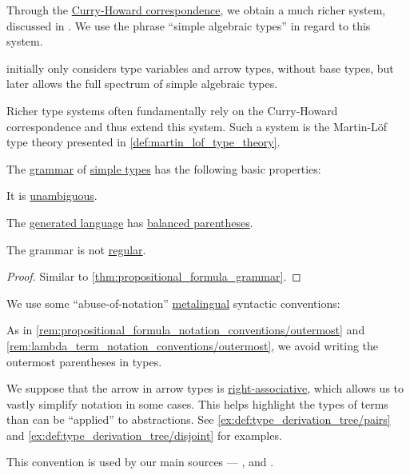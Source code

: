 \begin{concept}
\begin{thmenum}
     Through the \hyperref[con:curry_howard_correspondence]{Curry-Howard correspondence}, we obtain a much richer system, discussed in . We use the phrase \enquote{simple algebraic types} in regard to this system.

    \textcite[ch. 4]{Mimram2020ProgramEqualsProof} initially only considers type variables and arrow types, without base types, but later allows the full spectrum of simple algebraic types.

    Richer type systems often fundamentally rely on the Curry-Howard correspondence and thus extend this system. Such a system is the Martin-L\"of type theory presented in \cref{def:martin_lof_type_theory}.
  \end{thmenum}
\end{concept}

\begin{proposition}\label{thm:simple_type_grammar}
  The \hyperref[def:formal_grammar]{grammar} of \hyperref[def:simple_type]{simple types} has the following basic properties:
  \begin{thmenum}
     It is \hyperref[def:grammar_ambiguity]{unambiguous}.

     The \hyperref[def:formal_grammar/language]{generated language} has \hyperref[def:paired_delimiters]{balanced parentheses}.

     The grammar is not \hyperref[def:chomsky_hierarchy/regular]{regular}.
  \end{thmenum}
\end{proposition}
\begin{proof}
  Similar to \cref{thm:propositional_formula_grammar}.
\end{proof}

\begin{remark}\label{rem:simple_type_parentheses}
  We use some \enquote{abuse-of-notation} \hyperref[con:metalanguage]{metalingual} syntactic conventions:
  \begin{thmenum}
     As in \cref{rem:propositional_formula_notation_conventions/outermost} and \cref{rem:lambda_term_notation_conventions/outermost}, we avoid writing the outermost parentheses in types.

     We suppose that the arrow in arrow types is \hyperref[con:one_sided_associativity/right]{right-associative}, which allows us to vastly simplify notation in some cases. This helps highlight the types of terms than can be \enquote{applied} to abstractions. See \cref{ex:def:type_derivation_tree/pairs} and \cref{ex:def:type_derivation_tree/disjoint} for examples.

    This convention is used by our main sources --- \cite[\S 2A1.1]{Hindley1997BasicSTT}, \cite[notation 3.1.2]{Barendregt1992LambdaCalculiWithTypes} and \cite[\S 4.1.1]{Mimram2020ProgramEqualsProof}.
  \end{thmenum}
\end{remark}

